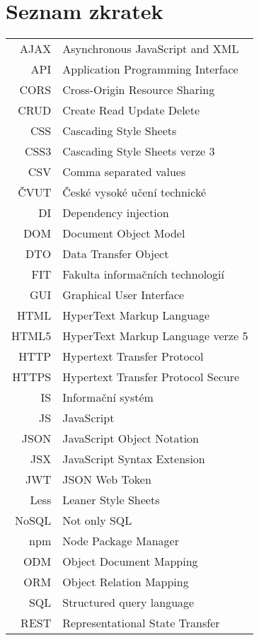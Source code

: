 \documentclass[czech,master,unicode]{ctufit-thesis}
\theoremstyle{plain}
\theoremstyle{definition}
\theoremstyle{remark}
\numberwithin{theorem}{chapter}
\begin{document}
\printabstractpage %

\chapter{Seznam zkratek}
 
\begin{longtable}{rl}
AJAX & Asynchronous JavaScript and XML\\
API & Application Programming Interface\\
CORS & Cross-Origin Resource Sharing\\
CRUD & Create Read Update Delete\\
CSS & Cascading Style Sheets\\
CSS3 & Cascading Style Sheets verze 3\\
CSV & Comma separated values\\
ČVUT & České vysoké učení technické\\
DI & Dependency injection\\
DOM & Document Object Model\\
DTO & Data Transfer Object\\
FIT & Fakulta informačních technologií\\
GUI & Graphical User Interface\\
HTML & HyperText Markup Language\\
HTML5 & HyperText Markup Language verze 5\\
HTTP & Hypertext Transfer Protocol\\
HTTPS & Hypertext Transfer Protocol Secure\\
IS & Informační systém\\
JS & JavaScript\\
JSON & JavaScript Object Notation\\
JSX & JavaScript Syntax Extension\\
JWT & JSON Web Token\\
Less & Leaner Style Sheets\\
NoSQL & Not only SQL\\
npm & Node Package Manager\\
ODM & Object Document Mapping\\
ORM & Object Relation Mapping\\
SQL & Structured query language\\
REST & Representational State Transfer\\

\end{longtable}
\end{document}
